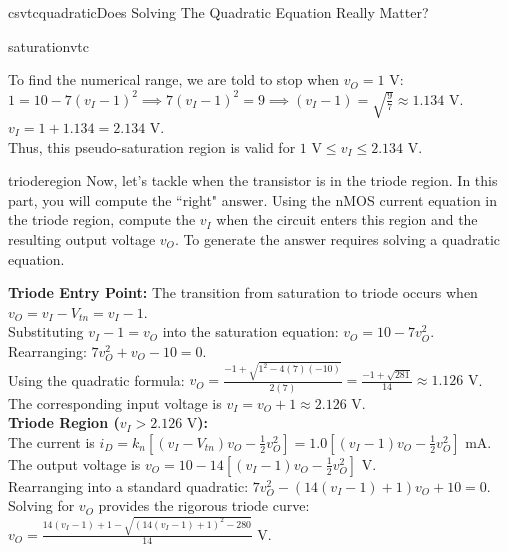 \begin{mainquestion}{csvtcquadratic}{Does Solving The Quadratic Equation Really Matter?}
\begin{partquestion}{saturationvtc}
\begin{answer}[3.5in]
        To find the numerical range, we are told to stop when $v_O = 1 \text{ V}$: \\
        $1 = 10 - 7(v_I - 1)^2 \implies 7(v_I - 1)^2 = 9 \implies (v_I - 1) = \sqrt{\frac{9}{7}} \approx 1.134 \text{ V}$. \\
        $v_I = 1 + 1.134 = 2.134 \text{ V}$. \\
        Thus, this pseudo-saturation region is valid for $1 \text{ V} \leq v_I \leq 2.134 \text{ V}$.
\end{answer}

\qnewpage
\end{partquestion}

\begin{partquestion}{trioderegion}
{Now, let's tackle when the transistor is in the triode region.  In this part, you will compute the ``right" answer.  Using the nMOS current equation in the triode region, compute the $v_I$ when the circuit enters this region and the resulting output voltage $v_O$.  To generate the answer requires solving a quadratic equation.}

\begin{answer}[3in]
        \textbf{Triode Entry Point:} The transition from saturation to triode occurs when $v_O = v_I - V_{tn} = v_I - 1$. \\
        Substituting $v_I - 1 = v_O$ into the saturation equation: $v_O = 10 - 7v_O^2$. \\
        Rearranging: $7v_O^2 + v_O - 10 = 0$. \\
        Using the quadratic formula: $v_O = \frac{-1 + \sqrt{1^2 - 4(7)(-10)}}{2(7)} = \frac{-1 + \sqrt{281}}{14} \approx 1.126 \text{ V}$. \\
        The corresponding input voltage is $v_I = v_O + 1 \approx 2.126 \text{ V}$. \\
        
        \textbf{Triode Region ($v_I > 2.126 \text{ V}$):} \\
        The current is $i_D = k_n \left[ (v_I - V_{tn})v_O - \frac{1}{2}v_O^2 \right] = 1.0 \left[ (v_I - 1)v_O - \frac{1}{2}v_O^2 \right] \text{ mA}$. \\
        The output voltage is $v_O = 10 - 14 \left[ (v_I - 1)v_O - \frac{1}{2}v_O^2 \right] \text{ V}$. \\
        Rearranging into a standard quadratic: $7v_O^2 - (14(v_I - 1) + 1)v_O + 10 = 0$. \\
        Solving for $v_O$ provides the rigorous triode curve: \\
        $v_O = \frac{14(v_I - 1) + 1 - \sqrt{(14(v_I - 1) + 1)^2 - 280}}{14} \text{ V}$.
\end{answer}


\end{partquestion}
\end{mainquestion}
